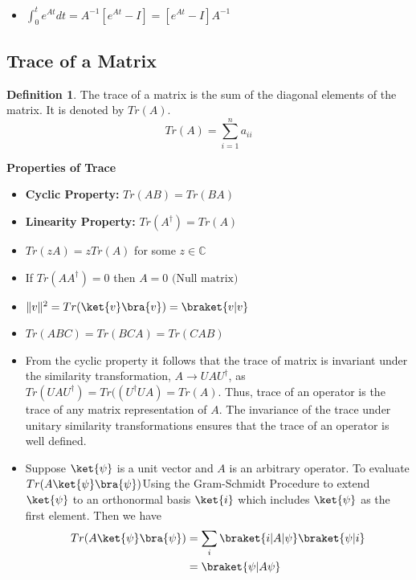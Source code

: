 \documentclass[12pt, oneside]{book}
\theoremstyle{definition}
\newtheorem{definition}{Definition}[section]
\theoremstyle{definition}
\theoremstyle{remark}
\begin{document}
\begin{itemize}
    \item $\int_0^t e^{At}dt=A^{-1}[e^{At}-I]=[e^{At}-I]A^{-1}$
\end{itemize}

\subsection{Trace of a Matrix}
\begin{definition} 
    The trace of a matrix is the sum of the diagonal elements of the matrix. It is denoted by $Tr(A)$.
    \[ Tr(A)=\sum_{i=1}^n a_{ii} \]
\end{definition}
\textbf{Properties of Trace}
\begin{itemize}
    \item \textbf{Cyclic Property: }$Tr(AB)=Tr(BA)$
    \item \textbf{Linearity Property: }$Tr(A^{\dagger})=Tr(A)$
    \item $Tr(zA)=zTr(A)$ for some $z \in \mathbb{C}$
    \item If $Tr(AA^{\dagger})=0$ then $A=0 \text{ (Null matrix)}$
    \item $\|v\|^2=Tr(\ket{v}\bra{v})=\braket{v|v}$
    \item $Tr(ABC)=Tr(BCA)=Tr(CAB)$
    \item From the cyclic property it follows that the trace of matrix is invariant under the similarity transformation,
    $A \rightarrow UAU^{\dagger}$, as $Tr(UAU^{\dagger})=Tr((U^{\dagger}UA)=Tr(A)$. Thus, trace of an operator is the trace of any matrix representation of $A$. The invariance of the trace under unitary similarity transformations ensures that the trace of an operator is well defined.
    \item Suppose $\ket{\psi}$ is a unit vector and $A$ is an arbitrary operator. To evaluate $Tr(A\ket{\psi}\bra{\psi})$Using the Gram-Schmidt Procedure to extend $\ket{\psi}$ to an orthonormal basis $\ket{i}$ which includes $\ket{\psi}$ as the first element. Then we have
    \begin{align*}
    Tr(A\ket{\psi}\bra{\psi})&=\sum_i \braket{i|A|\psi}\braket{\psi|i}\\
    &=\braket{\psi|A\psi}
    \end{align*}
\end{itemize}
\end{document}
